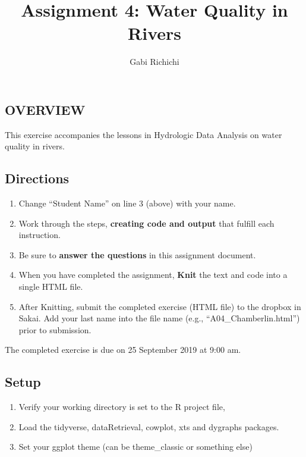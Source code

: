 \documentclass[]{article}
\title{Assignment 4: Water Quality in Rivers}
\author{Gabi Richichi}
\date{}
\providecommand{\tightlist}{%
  \setlength{\itemsep}{0pt}\setlength{\parskip}{0pt}}
\begin{document}
\maketitle

\hypertarget{overview}{%
\subsection{OVERVIEW}\label{overview}}

This exercise accompanies the lessons in Hydrologic Data Analysis on
water quality in rivers.

\hypertarget{directions}{%
\subsection{Directions}\label{directions}}

\begin{enumerate}
\def\labelenumi{\arabic{enumi}.}
\tightlist
\item
  Change ``Student Name'' on line 3 (above) with your name.
\item
  Work through the steps, \textbf{creating code and output} that fulfill
  each instruction.
\item
  Be sure to \textbf{answer the questions} in this assignment document.
\item
  When you have completed the assignment, \textbf{Knit} the text and
  code into a single HTML file.
\item
  After Knitting, submit the completed exercise (HTML file) to the
  dropbox in Sakai. Add your last name into the file name (e.g.,
  ``A04\_Chamberlin.html'') prior to submission.
\end{enumerate}

The completed exercise is due on 25 September 2019 at 9:00 am.

\hypertarget{setup}{%
\subsection{Setup}\label{setup}}

\begin{enumerate}
\def\labelenumi{\arabic{enumi}.}
\tightlist
\item
  Verify your working directory is set to the R project file,
\item
  Load the tidyverse, dataRetrieval, cowplot, xts and dygraphs packages.
\item
  Set your ggplot theme (can be theme\_classic or something else)
\end{enumerate}
\end{document}
